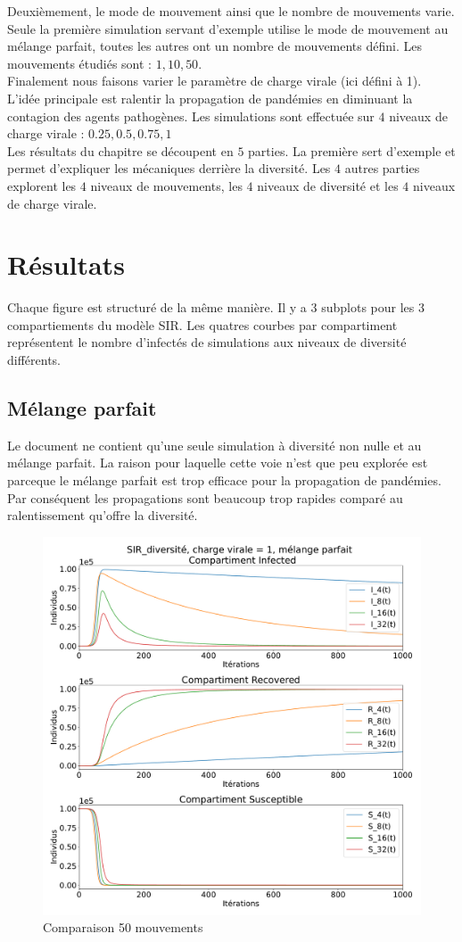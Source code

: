 Deuxièmement, le mode de mouvement ainsi que le nombre de mouvements varie. Seule la première simulation servant d'exemple utilise le mode de mouvement au mélange parfait, toutes les autres ont un nombre de mouvements défini. Les mouvements étudiés sont : $1,10,50$.\\

Finalement nous faisons varier le paramètre de charge virale (ici défini à 1). L'idée principale est ralentir la propagation de pandémies en diminuant la contagion des agents pathogènes. Les simulations sont effectuée sur $4$ niveaux de charge virale : $0.25,0.5,0.75,1$\\

Les résultats du chapitre se découpent en $5$ parties. La première sert d'exemple et permet d'expliquer les mécaniques derrière la diversité. Les $4$ autres parties explorent les $4$ niveaux de mouvements, les $4$ niveaux de diversité et les $4$ niveaux de charge virale.

\section{Résultats}

Chaque figure est structuré de la même manière. Il y a 3 subplots pour les 3 compartiements du modèle SIR. Les quatres courbes par compartiment représentent le nombre d'infectés de simulations aux niveaux de diversité différents.

\subsection{Mélange parfait}

Le document ne contient qu'une seule simulation à diversité non nulle et au mélange parfait. La raison pour laquelle cette voie n'est que peu explorée est parceque le mélange parfait est trop efficace pour la propagation de pandémies. Par conséquent les propagations sont beaucoup trop rapides comparé au ralentissement qu'offre la diversité. 

\begin{figure}[h]
	\centering
	\captionsetup{justification=centering}
	\includegraphics[width=.7\textwidth]{Images/SIR_diversite_mix.pdf}
	\caption{Comparaison 50 mouvements}
\end{figure}

